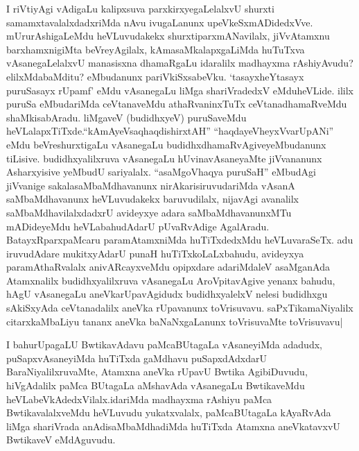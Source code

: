 \begin{artha}
I riVtiyAgi vAdigaLu kalipxsuva parxkirxyegaLelalxvU shurxti
samamxtavalalxdadxriMda nAvu ivugaLanunx
upeVkeSxmADidedxVve. mUrurAshigaLeMdu heVLuvudakekx
\break shurxtiparxmANavilalx, jiVvAtamxnu barxhamxnigiMta beVreyAgilalx,
kAmasaMkalapxgaLiMda \break huTuTxva vAsanegaLelalxvU manasisxna dhamaRgaLu
idaralilx madhayxma rAshiyAvudu? elilxMdabaMditu? eMbudanunx
pariVkiSxsabeVku. `tasayxheYtasayx puruSasayx rUpamf' eMdu vAsanegaLu liMga shariVradedxV
eMduheVLide. ililx puruSa eMbudariMda ceVtanaveMdu athaRvaninxTuTx
ceVtanadhamaRveMdu shaMkisabAradu. liMgaveV (budidhx\-yeV) puruSaveMdu
heVLalapxTiTxde.``kAmAyeV\s saqhaqdishirxtAH'' ``haqdayeVheyxVvarUpANi'' eMdu  beVreshurxtigaLu
vAsanegaLu budidhxdhamaRvAgiveyeMbudanunx
\-tiLisive. budidhxyalilxruva vAsanegaLu hUvinavAsaneyaMte jiVvananunx
Asharxyisive \-yeMbudU sariyalalx. ``asaMgoVhaqya puruSaH'' eMbudAgi jiVvanige
sakalasaMbaMdha\-vanunx nirAkarisiruvudariMda vAsanA saMbaMdhavanunx
heVLuvudakekx baruvudilalx, nijavAgi avanalilx saMbaMdhavilalxdadxrU
avideyxye adara saMbaMdhavanunxMTu mADideyeMdu heVLabahudAdarU
pUvaRvAdige AgalAradu. BatayxRparxpaMcaru paramAtamx\-niMda
huTiTxdedxMdu heVLuvaraSeTx. adu iruvudAdare mukitxyAdarU punaH
huTiTxkoLaLx\-bahudu, avideyxya paramAthaRvalalx anivARcayxveMdu
opipxdare adariMdaleV \-asaMganAda Atamxnalilx budidhxyalilxruva
vAsanegaLu AroVpitavAgive yenanx bahudu, hAgU vAsanegaLu
aneVkarUpavAgidudx budidhxyalelxV nelesi budidhxgu sAkiSxyAda
ceVtanadalilx aneVka rUpavanunx toVrisuvavu. saPxTikamaNiyalilx
citarxkaMbaLiyu tananx aneVka baNaNxgaLanunx toVrisuvaMte toVrisuvavu|
\end{artha}

\begin{artha}
I bahurUpagaLU BwtikavAdavu paMcaBUtagaLa vAsaneyiMda adadudx,
puSapxvAsaneyiMda huTiTxda gaMdhavu puSapxdAdxdarU
BaraNiyalilxruvaMte, Atamxna \-aneVka rUpavU Bwtika AgibiDuvudu,
hiVgAdalilx paMca BUtagaLa aMshavAda vAsanegaLu BwtikaveMdu
heVLabeVkAdedxVilalx.idariMda madhayxma rAshiyu paMca BwtikavalalxveMdu
heVLuvudu yukatxvalalx, paMcaBUtagaLa kAyaRvAda liMga \break shariVrada
anAdisaMbaMdhadiMda huTiTxda Atamxna aneVkatavxvU BwtikaveV \-eMdAguvudu.
\end{artha}

\centerline{}

